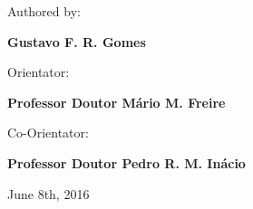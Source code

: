\vspace{0.5cm}
\begin{center}
\begin{normalsize}
\begin{large}
Authored by:
\end{large}
\end{normalsize}
\end{center}

\vspace{0.2cm}
\begin{center}
\begin{large}
\textbf{Gustavo F. R. Gomes}
\end{large}
\end{center}

\vspace{0,5cm}
\begin{center}
\begin{normalsize}
\begin{large}
Orientator:
\end{large}
\end{normalsize}
\end{center}

\vspace{0.2cm}
\begin{center}
\begin{large}
\textbf{Professor Doutor Mário M. Freire}
\end{large}
\end{center}

\vspace{0,5cm}
\begin{center}
\begin{normalsize}
\begin{large}
Co-Orientator:
\end{large}
\end{normalsize}
\end{center}

\vspace{0.2cm}
\begin{center}
\begin{large}
\textbf{Professor Doutor Pedro R. M. Inácio}
\end{large}
\end{center}

\vspace{0.5cm}
\begin{center}
\begin{normalsize}
	June 8th, 2016
\end{normalsize}
\end{center}
